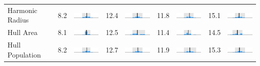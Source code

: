 \begin{table}
\begin{tabular}{l rm{7em} rm{7em} rm{7em} rm{7em}}
Harmonic Radius        &   8.2 &  \includegraphics[width=7em]{mini_hist/TX_2004_harm_radius} &  12.4 &  \includegraphics[width=7em]{mini_hist/TX_2008_harm_radius} &  11.8 &  \includegraphics[width=7em]{mini_hist/TX_2012_harm_radius} &  15.1 &  \includegraphics[width=7em]{mini_hist/TX_2016_harm_radius} \\
Hull Area              &   8.1 &       \includegraphics[width=7em]{mini_hist/TX_2004_hull_a} &  12.5 &       \includegraphics[width=7em]{mini_hist/TX_2008_hull_a} &  11.4 &       \includegraphics[width=7em]{mini_hist/TX_2012_hull_a} &  14.5 &       \includegraphics[width=7em]{mini_hist/TX_2016_hull_a} \\
Hull Population        &   8.2 &       \includegraphics[width=7em]{mini_hist/TX_2004_hull_p} &  12.7 &       \includegraphics[width=7em]{mini_hist/TX_2008_hull_p} &  11.9 &       \includegraphics[width=7em]{mini_hist/TX_2012_hull_p} &  15.3 &       \includegraphics[width=7em]{mini_hist/TX_2016_hull_p} \\

\end{tabular}
\end{table}
